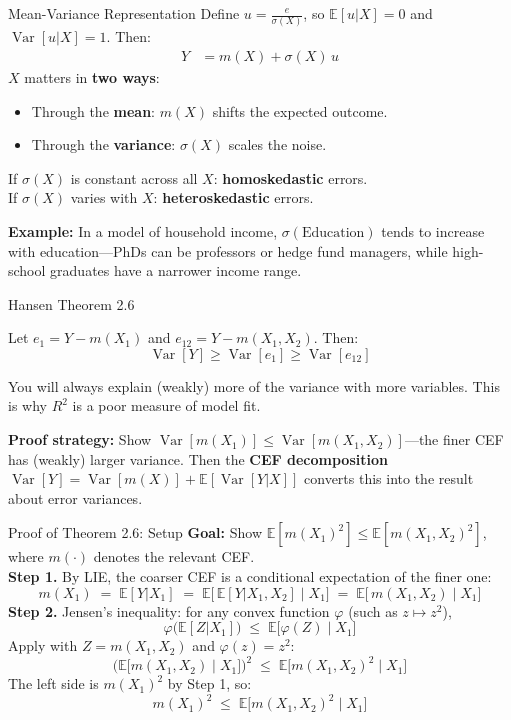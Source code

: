 \documentclass[aspectratio=169, handout, t]{beamer}
\numberwithin{equation}{section}
\begin{document}
\begin{frame}{Mean-Variance Representation}
Define $u=\frac{e}{\sigma(X)}$, so $\mathbb{E}[u|X]=0$ and $\operatorname{Var}[u|X]=1$.  Then:
\begin{align*}
Y&=m(X)+\sigma(X)\, u
\end{align*}
\pause
$X$ matters in \textbf{two ways}:
\begin{itemize}
\item Through the \textbf{mean}: $m(X)$ shifts the expected outcome.
\item Through the \textbf{variance}: $\sigma(X)$ scales the noise.
\end{itemize}

\bigskip\pause
If $\sigma(X)$ is constant across all $X$: \textbf{homoskedastic} errors.\\
If $\sigma(X)$ varies with $X$: \textbf{heteroskedastic} errors.

\bigskip\pause
\textbf{Example:} In a model of household income, $\sigma(\text{Education})$ tends to increase with education---PhDs can be professors or hedge fund managers, while high-school graduates have a narrower income range.
\end{frame}


\begin{frame}{Hansen Theorem 2.6}
\begin{tcolorbox}[colback=blue!5, colframe=blue!50, title=Theorem 2.6 (More Variables Reduce Error Variance)]
Let $e_1=Y-m(X_1)$ and $e_{12}=Y-m(X_1, X_2)$.  Then:
$$\operatorname{Var}[Y]\geq \operatorname{Var}[e_1]\geq \operatorname{Var}[e_{12}]$$
\end{tcolorbox}
\smallskip
You will always explain (weakly) more of the variance with more variables.
This is why $R^2$ is a poor measure of model fit.

\smallskip\pause
\textbf{Proof strategy:} Show $\operatorname{Var}[m(X_1)] \leq \operatorname{Var}[m(X_1,X_2)]$---the finer CEF has (weakly) larger variance.  Then the \textbf{CEF decomposition}
$\operatorname{Var}[Y] = \operatorname{Var}[m(X)] + \mathbb{E}[\operatorname{Var}[Y|X]]$
converts this into the result about error variances.
\end{frame}

\begin{frame}{Proof of Theorem 2.6: Setup}
\textbf{Goal:} Show $\mathbb{E}[m(X_1)^2] \leq \mathbb{E}[m(X_1,X_2)^2]$, where $m(\cdot)$ denotes the relevant CEF.\\ \medskip\pause
\textbf{Step 1.} By LIE, the coarser CEF is a conditional expectation of the finer one:
$$m(X_1) \;=\; \mathbb{E}[Y|X_1] \;=\; \mathbb{E}\!\big[\,\mathbb{E}[Y|X_1,X_2]\;\big|\;X_1\big] \;=\; \mathbb{E}\!\big[\,m(X_1,X_2)\;\big|\;X_1\big]$$
\pause
\textbf{Step 2.} Jensen's inequality: for any convex function $\varphi$ (such as $z\mapsto z^2$),
$$\varphi\!\big(\mathbb{E}[Z|X_1]\big) \;\leq\; \mathbb{E}\!\big[\varphi(Z)\;\big|\;X_1\big]$$
\pause
Apply with $Z = m(X_1,X_2)$ and $\varphi(z)=z^2$:
$$\Big(\mathbb{E}\!\big[m(X_1,X_2)\;\big|\;X_1\big]\Big)^{\!2} \;\leq\; \mathbb{E}\!\big[m(X_1,X_2)^2\;\big|\;X_1\big]$$
\pause
The left side is $m(X_1)^2$ by Step 1, so:
$$m(X_1)^2 \;\leq\; \mathbb{E}\!\big[m(X_1,X_2)^2\;\big|\;X_1\big]$$
\end{frame}
\end{document}
